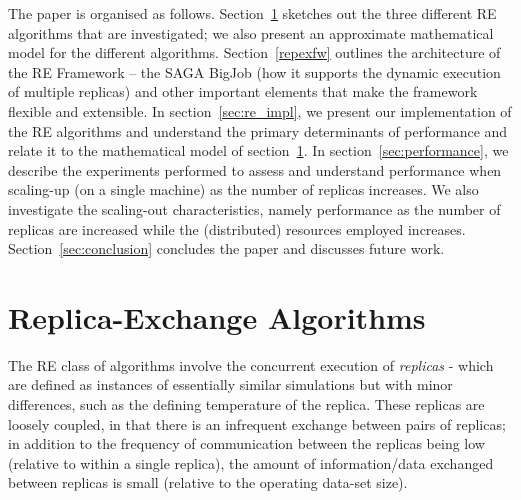 \documentclass{rspublic}
\newcommand{\jhanote}[1]{ {\textcolor{red} { ***shantenu: #1 }}}
\newcommand{\alnote}[1]{ {\textcolor{blue} { ***andre: #1 }}}
\newcommand{\athotanote}[1]{ {\textcolor{green} { ***athota: #1 }}}
\newcommand{\alnote}[1]{}
\newcommand{\athotanote}[1]{}
\newcommand{\jhanote}[1]{}
\begin{document}
The paper is organised as follows. Section~\ref{sec:repex-approach}
sketches out the three different RE algorithms that are investigated; 
we also present an approximate mathematical model for the different algorithms.  
Section~\ref{repexfw} outlines the architecture of the RE Framework -- the SAGA BigJob
(how it supports the dynamic execution of multiple replicas) and other
important elements that make the framework flexible and extensible.
In section~\ref{sec:re_impl}, we present our implementation of the RE algorithms and
understand the primary determinants of performance and relate it to
the mathematical model of section~\ref{sec:repex-approach}.  
In section~\ref{sec:performance}, we describe the experiments performed 
to assess and understand performance when scaling-up (on a single machine) 
as the number of replicas increases. We also investigate the scaling-out
characteristics, namely performance as the number of replicas are
increased while the (distributed) resources employed
increases. %
Section~\ref{sec:conclusion} concludes the paper and discusses future work.


\section{Replica-Exchange Algorithms}\label{sec:repex-approach}

The RE class of algorithms involve the concurrent execution of
\emph{replicas} - which are defined as instances of essentially
similar simulations but with minor differences, such as the defining
temperature of the replica. These replicas are loosely coupled, in
that there is an infrequent exchange between pairs of 
replicas; in addition to the frequency of communication between the
replicas being low (relative to within a single replica), the amount
of information/data exchanged between replicas is small (relative to
the operating data-set size).

\end{document}
